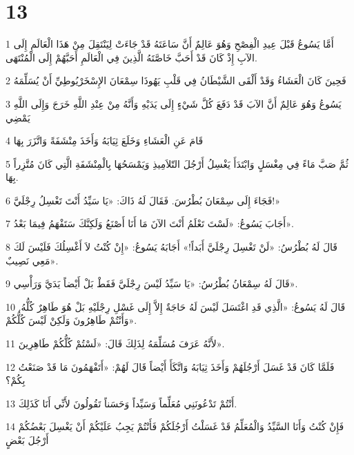 \chapter{13}

\par 1 أَمَّا يَسُوعُ قَبْلَ عِيدِ الْفِصْحِ وَهُوَ عَالِمٌ أَنَّ سَاعَتَهُ قَدْ جَاءَتْ لِيَنْتَقِلَ مِنْ هَذَا الْعَالَمِ إِلَى الآبِ إِذْ كَانَ قَدْ أَحَبَّ خَاصَّتَهُ الَّذِينَ فِي الْعَالَمِ أَحَبَّهُمْ إِلَى الْمُنْتَهَى.
\par 2 فَحِينَ كَانَ الْعَشَاءُ وَقَدْ أَلْقَى الشَّيْطَانُ فِي قَلْبِ يَهُوذَا سِمْعَانَ الإِسْخَرْيُوطِيِّ أَنْ يُسَلِّمَهُ
\par 3 يَسُوعُ وَهُوَ عَالِمٌ أَنَّ الآبَ قَدْ دَفَعَ كُلَّ شَيْءٍ إِلَى يَدَيْهِ وَأَنَّهُ مِنْ عِنْدِ اللَّهِ خَرَجَ وَإِلَى اللَّهِ يَمْضِي
\par 4 قَامَ عَنِ الْعَشَاءِ وَخَلَعَ ثِيَابَهُ وَأَخَذَ مِنْشَفَةً وَاتَّزَرَ بِهَا
\par 5 ثُمَّ صَبَّ مَاءً فِي مِغْسَلٍ وَابْتَدَأَ يَغْسِلُ أَرْجُلَ التّلاَمِيذِ وَيَمْسَحُهَا بِالْمِنْشَفَةِ الَّتِي كَانَ مُتَّزِراً بِهَا.
\par 6 فَجَاءَ إِلَى سِمْعَانَ بُطْرُسَ. فَقَالَ لَهُ ذَاكَ: «يَا سَيِّدُ أَنْتَ تَغْسِلُ رِجْلَيَّ!»
\par 7 أَجَابَ يَسُوعُ: «لَسْتَ تَعْلَمُ أَنْتَ الآنَ مَا أَنَا أَصْنَعُ وَلَكِنَّكَ سَتَفْهَمُ فِيمَا بَعْدُ».
\par 8 قَالَ لَهُ بُطْرُسُ: «لَنْ تَغْسِلَ رِجْلَيَّ أَبَداً!» أَجَابَهُ يَسُوعُ: «إِنْ كُنْتُ لاَ أَغْسِلُكَ فَلَيْسَ لَكَ مَعِي نَصِيبٌ».
\par 9 قَالَ لَهُ سِمْعَانُ بُطْرُسُ: «يَا سَيِّدُ لَيْسَ رِجْلَيَّ فَقَطْ بَلْ أَيْضاً يَدَيَّ وَرَأْسِي».
\par 10 قَالَ لَهُ يَسُوعُ: «الَّذِي قَدِ اغْتَسَلَ لَيْسَ لَهُ حَاجَةٌ إِلاَّ إِلَى غَسْلِ رِجْلَيْهِ بَلْ هُوَ طَاهِرٌ كُلُّهُ. وَأَنْتُمْ طَاهِرُونَ وَلَكِنْ لَيْسَ كُلُّكُمْ».
\par 11 لأَنَّهُ عَرَفَ مُسَلِّمَهُ لِذَلِكَ قَالَ: «لَسْتُمْ كُلُّكُمْ طَاهِرِينَ».
\par 12 فَلَمَّا كَانَ قَدْ غَسَلَ أَرْجُلَهُمْ وَأَخَذَ ثِيَابَهُ وَاتَّكَأَ أَيْضاً قَالَ لَهُمْ: «أَتَفْهَمُونَ مَا قَدْ صَنَعْتُ بِكُمْ؟
\par 13 أَنْتُمْ تَدْعُونَنِي مُعَلِّماً وَسَيِّداً وَحَسَناً تَقُولُونَ لأَنِّي أَنَا كَذَلِكَ.
\par 14 فَإِنْ كُنْتُ وَأَنَا السَّيِّدُ وَالْمُعَلِّمُ قَدْ غَسَلْتُ أَرْجُلَكُمْ فَأَنْتُمْ يَجِبُ عَلَيْكُمْ أَنْ يَغْسِلَ بَعْضُكُمْ أَرْجُلَ بَعْضٍ
